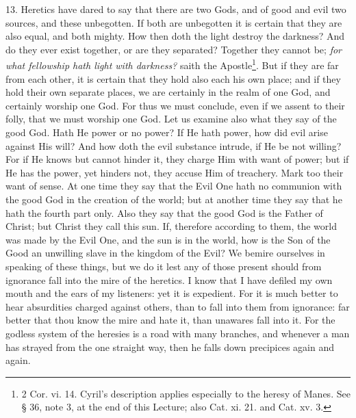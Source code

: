 13. Heretics have dared to say that there are two Gods, and of good and evil two sources, and these unbegotten. If both are unbegotten it is certain that they are also equal, and both mighty. How then doth the light destroy the darkness? And do they ever exist together, or are they separated? Together they cannot be; \emph{for what fellowship hath light with darkness?} saith the Apostle\footnote{2 Cor. vi. 14. Cyril’s description applies especially to the heresy of Manes. See § 36, note 3, at the end of this Lecture; also Cat. xi. 21. and Cat. xv. 3.}. But if they are far from each other, it is certain that they hold also each his own place; and if they hold their own separate places, we are certainly in the realm of one God, and certainly worship one God. For thus we must conclude, even if we assent to their folly, that we must worship one God. Let us examine also what they say of the good God. Hath He power or no power? If He hath power, how did evil arise against His will? And how doth the evil substance intrude, if He be not willing? For if He knows but cannot hinder it, they charge Him with want of power; but if He has the power, yet hinders not, they accuse Him of treachery. Mark too their want of sense. At one time they say that the Evil One hath no communion with the good God in the creation of the world; but at another time they say that he hath the fourth part only. Also they say that the good God is the Father of Christ; but Christ they call this sun. If, therefore according to them, the world was made by the Evil One, and the sun is in the world, how is the Son of the Good an unwilling slave in the kingdom of the Evil? We bemire ourselves in speaking of these things, but we do it lest any of those present should from ignorance fall into the mire of the heretics. I know that I have defiled my own mouth and the ears of my listeners: yet it is expedient. For it is much better to hear absurdities charged against others, than to fall into them from ignorance: far better that thou know the mire and hate it, than unawares fall into it. For the godless system of the heresies is a road with many branches, and whenever a man has strayed from the one straight way, then he falls down precipices again and again.


